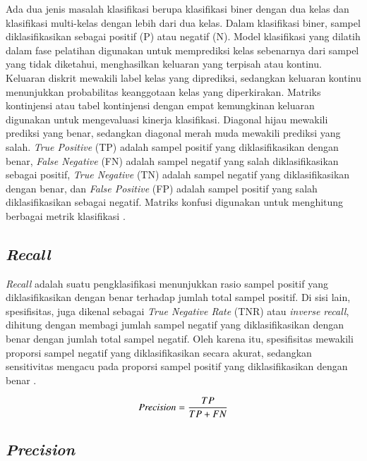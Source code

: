 Ada dua jenis masalah klasifikasi berupa klasifikasi biner dengan dua kelas dan klasifikasi multi-kelas dengan lebih dari dua kelas. Dalam klasifikasi biner, sampel diklasifikasikan sebagai positif (P) atau negatif (N). Model klasifikasi yang dilatih dalam fase pelatihan digunakan untuk memprediksi kelas sebenarnya dari sampel yang tidak diketahui, menghasilkan keluaran yang terpisah atau kontinu. Keluaran diskrit mewakili label kelas yang diprediksi, sedangkan keluaran kontinu menunjukkan probabilitas keanggotaan kelas yang diperkirakan. Matriks kontinjensi atau tabel kontinjensi dengan empat kemungkinan keluaran digunakan untuk mengevaluasi kinerja klasifikasi. Diagonal hijau mewakili prediksi yang benar, sedangkan diagonal merah muda mewakili prediksi yang salah. \emph{True Positive} (TP) adalah sampel positif yang diklasifikasikan dengan benar, \emph{False Negative} (FN) adalah sampel negatif yang salah diklasifikasikan sebagai positif, \emph{True Negative} (TN) adalah sampel negatif yang diklasifikasikan dengan benar, dan \emph{False Positive} (FP) adalah sampel positif yang salah diklasifikasikan sebagai negatif. Matriks konfusi digunakan untuk menghitung berbagai metrik klasifikasi \parencite{Tharwat}.

\subsection{\emph{Recall}}
\label{subsec:cnn}

\emph{Recall} adalah suatu pengklasifikasi menunjukkan rasio sampel positif yang diklasifikasikan dengan benar terhadap jumlah total sampel positif. Di sisi lain, spesifisitas, juga dikenal sebagai \emph{True Negative Rate} (TNR) atau \emph{inverse recall}, dihitung dengan membagi jumlah sampel negatif yang diklasifikasikan dengan benar dengan jumlah total sampel negatif. Oleh karena itu, spesifisitas mewakili proporsi sampel negatif yang diklasifikasikan secara akurat, sedangkan sensitivitas mengacu pada proporsi sampel positif yang diklasifikasikan dengan benar \parencite{Tharwat}.

\begin{equation}
  \label{eq:KonversiPanjangLangkah}
  \emph{Precision} = \frac{TP}{TP + FN}
\end{equation}

\subsection{\emph{Precision}}
\label{subsec:cnn}

